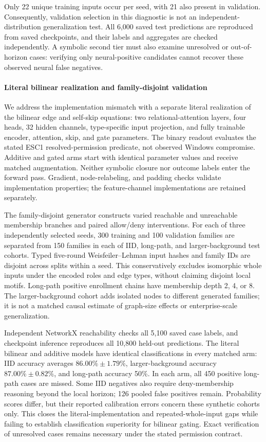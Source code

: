 Only 22 unique training inputs occur per seed, with 21 also present in validation. Consequently, validation selection in this diagnostic is not an independent-distribution generalization test. All 6,000 saved test predictions are reproduced from saved checkpoints, and their labels and aggregates are checked independently. A symbolic second tier must also examine unresolved or out-of-horizon cases: verifying only neural-positive candidates cannot recover these observed neural false negatives.

\paragraph{Literal bilinear realization and family-disjoint validation}
We address the implementation mismatch with a separate literal realization of the bilinear edge and self-skip equations: two relational-attention layers, four heads, 32 hidden channels, type-specific input projection, and fully trainable encoder, attention, skip, and gate parameters. The binary readout evaluates the stated ESC1 resolved-permission predicate, not observed Windows compromise. Additive and gated arms start with identical parameter values and receive matched augmentation. Neither symbolic closure nor outcome labels enter the forward pass. Gradient, node-relabeling, and padding checks validate implementation properties; the feature-channel implementations are retained separately.

The family-disjoint generator constructs varied reachable and unreachable membership branches and paired allow/deny interventions. For each of three independently selected seeds, 300 training and 100 validation families are separated from 150 families in each of IID, long-path, and larger-background test cohorts. Typed five-round Weisfeiler--Lehman input hashes and family IDs are disjoint across splits within a seed. This conservatively excludes isomorphic whole inputs under the encoded roles and edge types, without claiming disjoint local motifs. Long-path positive enrollment chains have membership depth 2, 4, or 8. The larger-background cohort adds isolated nodes to different generated families; it is not a matched causal estimate of graph-size effects or enterprise-scale generalization.



Independent NetworkX reachability checks all 5,100 saved case labels, and checkpoint inference reproduces all 10,800 held-out predictions. The literal bilinear and additive models have identical classifications in every matched arm: IID accuracy averages $86.00\%\pm1.79\%$, larger-background accuracy $87.00\%\pm0.82\%$, and long-path accuracy 50\%. In each arm, all 450 positive long-path cases are missed. Some IID negatives also require deny-membership reasoning beyond the local horizon; 126 pooled false positives remain. Probability scores differ, but their reported calibration errors concern these synthetic cohorts only. This closes the literal-implementation and repeated-whole-input gaps while failing to establish classification superiority for bilinear gating. Exact verification of unresolved cases remains necessary under the stated permission contract.

